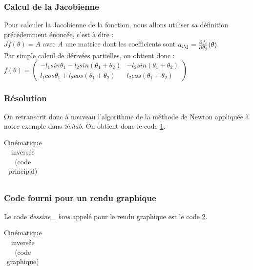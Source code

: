 \documentclass[a4paper,10pt]{report}
\begin{document}
\subsubsection{Calcul de la Jacobienne}
Pour calculer la Jacobienne de la fonction, nous allons utiliser sa définition précédemment énoncée, c'est à dire :\\
$Jf(\theta)=A$ avec $A$ une matrice dont les coefficients sont $a_{i\j}=\frac{\partial f_i}{\partial \theta_j}(\theta)$\\
Par simple calcul de dérivées partielles, on obtient donc :\\
$f(\theta)=\left( \begin{array}{ll}
-l_1 sin \theta_1 - l_2 sin(\theta_1 + \theta_2 ) & -l_2sin(\theta_1+\theta_2) \\
l_1 cos \theta_1 + l_2 cos(\theta_1 + \theta_2 ) & l_2cos(\theta_1+\theta_2)
 \end{array} \right)$

\newpage
\subsubsection{Résolution}
On retranscrit donc à nouveau l'algorithme de la méthode de Newton appliquée à notre exemple dans \textit{Scilab}. On obtient donc le code \ref{code_cinematique}.
\begin{table}[H]
\caption{Cinématique inversée (code principal)}
\begin{tabular}{l}
\\
\end{tabular}
\label{code_cinematique}
\end{table}

\subsubsection{Code fourni pour un rendu graphique}
Le code \textit{dessine\_ bras} appelé pour le rendu graphique est le code \ref{rendu_graphique}.
\begin{table}[H]
\caption{Cinématique inversée (code graphique)}
\begin{tabular}{l}
\\
\end{tabular}
\label{rendu_graphique}
\end{table}

\newpage
\end{document}
